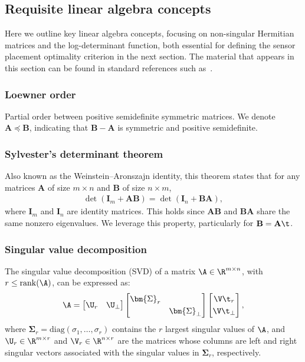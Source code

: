 \documentclass{aims} %
\theoremstyle{definition}
\begin{document}
\subsection{Requisite linear algebra concepts}
Here we outline key linear algebra concepts, focusing on non-singular Hermitian matrices  and the 
log-determinant  function, both essential for defining the sensor placement optimality criterion in the next section. The material that appears in this section can be found in standard references such as~\cite{bhatia1997matrix,horn2013matrix}. 

\subsubsection*{Loewner order}
Partial order between positive semidefinite symmetric matrices. We  denote $\mathbf{A} \preceq \mathbf{B}$, indicating that $\mathbf{B} - \mathbf{A}$ is symmetric and positive semidefinite.
%
\subsubsection*{Sylvester's determinant theorem}  
Also known as the Weinstein–Aronszajn identity, this theorem states that for any matrices $\mathbf{A}$ of size $m \times n$ and $\mathbf{B}$ of size $n \times m$,     
\begin{align} \label{def:SylvestersDeterminant}
\det(\mathbf{I}_m + \mathbf{AB}) = \det(\mathbf{I}_n + \mathbf{BA}),
\end{align}
where $\mathbf{I}_m$ and $\mathbf{I}_n$ are identity matrices.
This holds since $\mathbf{AB}$ and $\mathbf{BA}$ share the same nonzero eigenvalues. We leverage this property, particularly for  $\mathbf{B} = \mathbf{A}\t$.
%
%
\subsubsection*{Singular value decomposition} 
The singular value decomposition (SVD) of a matrix \(\A \in \R^{m \times n}\), with \(r \leq  \mathrm{rank}(\A)\), can be expressed as:
\begin{align}\label{def:SVD}
    \A = 
    \begin{bmatrix}
        \U_r & \U_\perp
    \end{bmatrix}
    \begin{bmatrix}
        \bm{\Sigma}_r & \\[0.1cm] & \bm{\Sigma}_\perp
    \end{bmatrix}
    \begin{bmatrix}
        \V\t_r  \\[0.1cm]  \V\t_\perp
    \end{bmatrix},
\end{align}
where   $\bm \Sigma_r =\mathrm{diag}(\sigma_1,\ldots,\sigma_r)$ contains   the \(r\) largest singular values of \(\A\), and $\U_r \in \R^{m \times r}$ and $\V_r \in \R^{n \times r}$ are the matrices whose columns are  left and right singular vectors associated with the singular values in \(\bm{\Sigma}_r\), respectively.
\end{document}
